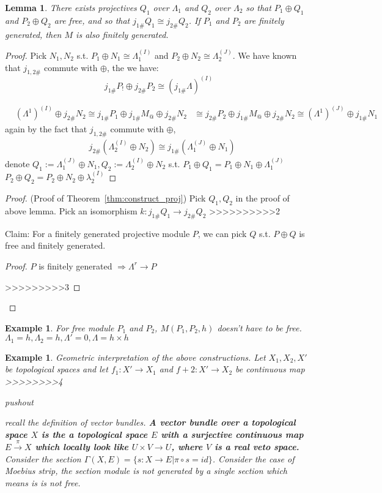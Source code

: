\documentclass[11pt]{article}
\newtheorem{lemma}[thm]{Lemma}
\newtheorem{ex}[thm]{Example}
\newcommand{\lrta}{\longrightarrow}
\newcommand{\Lrta}{\Longrightarrow}
\begin{document}
\begin{lemma}
There exists projectives $Q_1$ over $\Lambda_1$ and $Q_2$ over $\Lambda_2$ so that $P_1\oplus Q_1$ and $P_2\oplus Q_2$ are free, and so that $j_{1\#}Q_1\cong j_{2\#}Q_2$. If $P_1$ and $P_2$ are finitely generated, then $M$  is also finitely generated.
\end{lemma}
\begin{proof}
Pick $N_1, N_2$ s.t. $P_1\oplus N_1\cong \Lambda_1^{(I)}$ and $P_2\oplus N_2\cong \Lambda^{(J)}_2$. We have known that $j_{1,2\#}$ commute with $\oplus$, the we have:
$$
j_{1\#}P_!\oplus j_{2\#} P_2\cong (j_{1\#}\Lambda)^{(I)}
$$

$$
\begin{aligned}
& (\Lambda^1)^{(I)}\oplus j_{2\#} N_2\cong j_{1\#}P_1\oplus j_{1\#} M_@\oplus j_{2\#}N_2
&\cong j_{2\#}P_2\oplus j_{1\#} M_@\oplus j_{2\#}N_2 \cong (\Lambda^1)^{(J)}\oplus j_{1\#}N_1
\end{aligned}
$$
again by the fact that $j_{1,2\#}$ commute with $\oplus$, 
$$
\begin{aligned}
& j_{2\#}(\Lambda_2^{(I)}\oplus N_2)\cong j_{1\#}(\Lambda_1^{(J)}\oplus N_1)
\end{aligned}
$$
denote $Q_1:=\Lambda^{(J)}_1\oplus N_1, Q_2:=\Lambda_2^{(I)}\oplus N_2$ s.t. $P_1\oplus Q_1=P_1\oplus N_1\oplus \Lambda_1^{(J)}$ $P_2\oplus Q_2=P_2\oplus N_2\oplus \lambda_2^{(I)}$
\end{proof}

\begin{proof}(Proof of Theorem~\ref{thm:construct_proj}) Pick $Q_1, Q_2$ in the proof of above lemma. Pick an isomorphism $k:j_{1\#}Q_1\lrta j_{2\#}Q_2$
>>>>>>>>>>2

Claim: For  a finitely generated projective module $P$, we can pick $Q$ s.t. $P\oplus Q$ is free and finitely generated.
\begin{proof}
$P$ is finitely generated $\Lrta \Lambda^r\rightarrow P$

>>>>>>>>>3

\end{proof}
\end{proof}

\begin{ex}
For free module $P_1$ and $P_2$, $M(P_1,P_2,h)$ doesn't have to be free.
$\Lambda_1=h, \Lambda_2=h, \Lambda'=0, \Lambda=h\times h$
\end{ex}

\begin{ex}
Geometric interpretation of the  above constructions. Let $X_1,X_2,X'$ be topological spaces and let $f_1:X'\lrta X_1$ and $f+2:X'\lrta X_2$ be continuous map
>>>>>>>>4


pushout

recall the definition of vector bundles. \textbf{A vector bundle over a topological space $X$ is the a topological space $E$ with a surjective  continuous map $E\overset{\pi}{\lrta}X$ which locally look like $U\times V\lrta U$, where $V$ is a real veto space.} Consider the section $\Gamma(X,E)=\{s:X\lrta E| \pi\circ s=id \}$. Consider the case of Moebius strip, the section module is not generated by a single section which means is is not free.
\end{ex}
\end{document}
